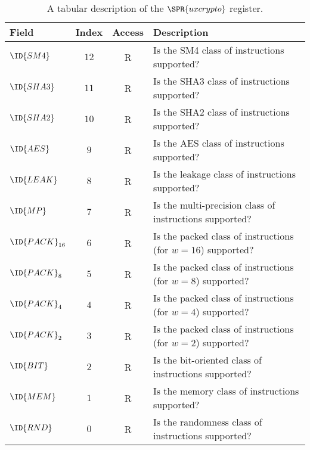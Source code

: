 \begin{table}[p]
\begin{center}
\begin{tabular}{|l|c|c|l|}
\hline
Field            & Index           & Access & Description                                                            \\ 
\hline
$\ID{SM4}      $ & $           12$ & R      & Is the SM4             class of instructions                supported? \\
$\ID{SHA3}     $ & $           11$ & R      & Is the SHA3            class of instructions                supported? \\
$\ID{SHA2}     $ & $           10$ & R      & Is the SHA2            class of instructions                supported? \\
$\ID{AES }     $ & $            9$ & R      & Is the AES             class of instructions                supported? \\
$\ID{LEAK}     $ & $            8$ & R      & Is the leakage         class of instructions                supported? \\
$\ID{MP  }     $ & $            7$ & R      & Is the multi-precision class of instructions                supported? \\
$\ID{PACK}_{16}$ & $            6$ & R      & Is the packed          class of instructions (for $w = 16$) supported? \\
$\ID{PACK}_{8} $ & $            5$ & R      & Is the packed          class of instructions (for $w =  8$) supported? \\
$\ID{PACK}_{4} $ & $            4$ & R      & Is the packed          class of instructions (for $w =  4$) supported? \\
$\ID{PACK}_{2} $ & $            3$ & R      & Is the packed          class of instructions (for $w =  2$) supported? \\
$\ID{BIT }     $ & $            2$ & R      & Is the bit-oriented    class of instructions                supported? \\
$\ID{MEM }     $ & $            1$ & R      & Is the memory          class of instructions                supported? \\
$\ID{RND }     $ & $            0$ & R      & Is the randomness      class of instructions                supported? \\
\hline
\end{tabular}
\end{center}
\caption{A tabular      description of the $\SPR{uxcrypto}$ register.}
\label{tab:csr:uxcrypto}
\end{table}

